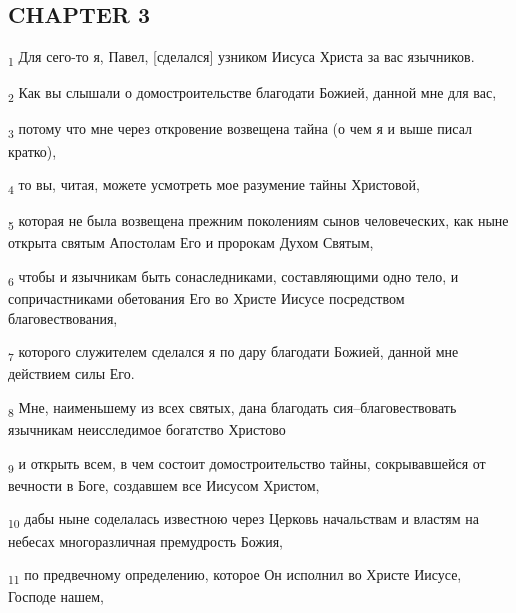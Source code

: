 \subsection{CHAPTER 3}
\begin{tcolorbox}
\textsubscript{1} Для сего-то я, Павел, [сделался] узником Иисуса Христа за вас язычников.
\end{tcolorbox}
\begin{tcolorbox}
\textsubscript{2} Как вы слышали о домостроительстве благодати Божией, данной мне для вас,
\end{tcolorbox}
\begin{tcolorbox}
\textsubscript{3} потому что мне через откровение возвещена тайна (о чем я и выше писал кратко),
\end{tcolorbox}
\begin{tcolorbox}
\textsubscript{4} то вы, читая, можете усмотреть мое разумение тайны Христовой,
\end{tcolorbox}
\begin{tcolorbox}
\textsubscript{5} которая не была возвещена прежним поколениям сынов человеческих, как ныне открыта святым Апостолам Его и пророкам Духом Святым,
\end{tcolorbox}
\begin{tcolorbox}
\textsubscript{6} чтобы и язычникам быть сонаследниками, составляющими одно тело, и сопричастниками обетования Его во Христе Иисусе посредством благовествования,
\end{tcolorbox}
\begin{tcolorbox}
\textsubscript{7} которого служителем сделался я по дару благодати Божией, данной мне действием силы Его.
\end{tcolorbox}
\begin{tcolorbox}
\textsubscript{8} Мне, наименьшему из всех святых, дана благодать сия--благовествовать язычникам неисследимое богатство Христово
\end{tcolorbox}
\begin{tcolorbox}
\textsubscript{9} и открыть всем, в чем состоит домостроительство тайны, сокрывавшейся от вечности в Боге, создавшем все Иисусом Христом,
\end{tcolorbox}
\begin{tcolorbox}
\textsubscript{10} дабы ныне соделалась известною через Церковь начальствам и властям на небесах многоразличная премудрость Божия,
\end{tcolorbox}
\begin{tcolorbox}
\textsubscript{11} по предвечному определению, которое Он исполнил во Христе Иисусе, Господе нашем,
\end{tcolorbox}
